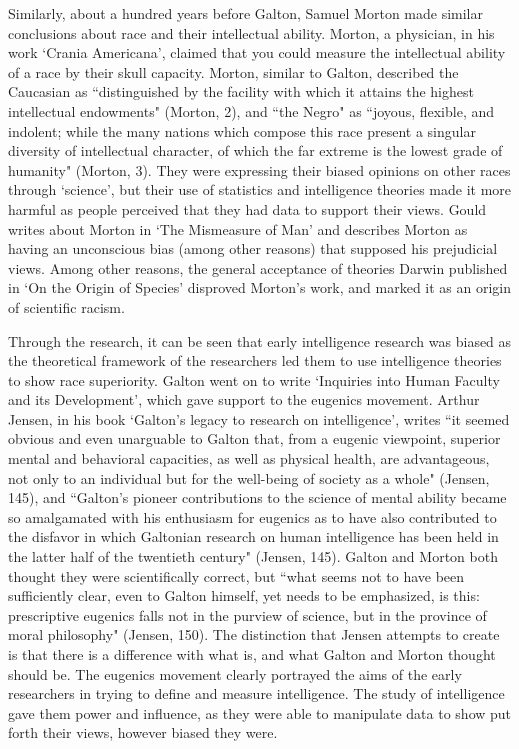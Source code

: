 \documentclass[12pt, oneside]{article}
\begin{document}
\par Similarly, about a hundred years before Galton, Samuel Morton made similar conclusions about race and their intellectual ability. Morton, a physician, in his work `Crania Americana', claimed that you could measure the intellectual ability of a race by their skull capacity. Morton, similar to Galton, described the Caucasian as ``distinguished by the facility with which it attains the highest intellectual endowments" (Morton, 2), and ``the Negro" as ``joyous, flexible, and indolent; while the many nations which compose this race present a singular diversity of intellectual character, of which the far extreme is the lowest grade of humanity" (Morton, 3). They were expressing their biased opinions on other races through `science', but their use of statistics and intelligence theories made it more harmful as people perceived that they had data to support their views. Gould writes about Morton in `The Mismeasure of Man' and describes Morton as having an unconscious bias (among other reasons) that supposed his prejudicial views. Among other reasons, the general acceptance of theories Darwin published in `On the Origin of Species' disproved Morton's work, and marked it as an origin of scientific racism.

\par Through the research, it can be seen that early intelligence research was biased as the theoretical framework of the researchers led them to use intelligence theories to show race superiority. Galton went on to write `Inquiries into Human Faculty and its Development', which gave support to the eugenics movement. Arthur Jensen, in his book `Galton's legacy to research on intelligence', writes ``it seemed obvious and even unarguable to Galton that, from a eugenic viewpoint, superior mental and behavioral capacities, as well as physical health, are advantageous, not only to an individual but for the well-being of society as a whole" (Jensen, 145), and ``Galton's pioneer contributions to the science of mental ability became so amalgamated with his enthusiasm for eugenics as to have also contributed to the disfavor in which Galtonian research on human intelligence has been held in the latter half of the twentieth century" (Jensen, 145). Galton and Morton both thought they were scientifically correct, but ``what seems not to have been sufficiently clear, even to Galton himself, yet needs to be emphasized, is this: prescriptive eugenics falls not in the purview of science, but in the province of moral philosophy" (Jensen, 150). The distinction that Jensen attempts to create is that there is a difference with what is, and what Galton and Morton thought should be. The eugenics movement clearly portrayed the aims of the early researchers in trying to define and measure intelligence. The study of intelligence gave them power and influence, as they were able to manipulate data to show put forth their views, however biased they were.
\end{document}
